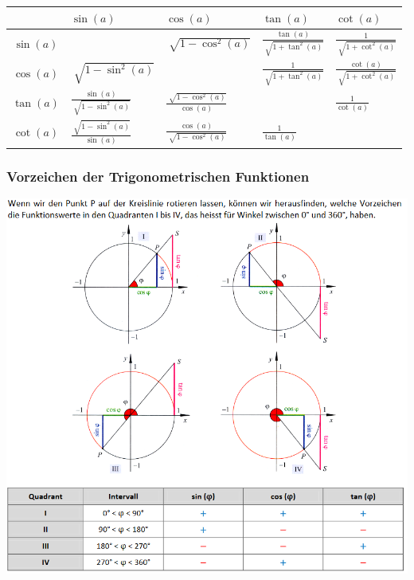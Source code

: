 \begin{tabularx}{1\textwidth} {
        | >{\raggedright\arraybackslash}c
        | >{\raggedright\arraybackslash}X
        | >{\raggedright\arraybackslash}X
        | >{\raggedright\arraybackslash}X
        | >{\raggedright\arraybackslash}X |}
    \hline
                        & \boldmath $\sin(a)$                    & \boldmath $\cos(a)$                    & \boldmath $\tan(a)$                    & \boldmath $\cot(a)$                    \\\hline
    \boldmath $\sin(a)$ &                                        & $\sqrt[]{1-\cos^2(a)}$                 & $\frac{\tan(a)}{\sqrt[]{1+\tan^2(a)}}$ & $\frac{1}{\sqrt[]{1+\cot^2(a)}}$       \\ \hline
    \boldmath $\cos(a)$ & $\sqrt[]{1-\sin^2(a)}$                 &                                        & $\frac{1}{\sqrt[]{1+\tan^2(a)}}$       & $\frac{\cot(a)}{\sqrt[]{1+\cot^2(a)}}$ \\ \hline
    \boldmath $\tan(a)$ & $\frac{\sin(a)}{\sqrt[]{1-\sin^2(a)}}$ & $\frac{\sqrt[]{1-\cos^2(a)}}{\cos(a)}$ &                                        & $\frac{1}{\cot(a)}$                    \\ \hline
    \boldmath $\cot(a)$ & $\frac{\sqrt[]{1-\sin^2(a)}}{\sin(a)}$ & $\frac{\cos(a)}{\sqrt[]{1-\cos^2(a)}}$ & $\frac{1}{\tan(a)}$                    &                                        \\ \hline
\end{tabularx}
\subsubsection{Vorzeichen der Trigonometrischen Funktionen}
\includegraphics[scale=0.7]{einheitskreis4.PNG}

